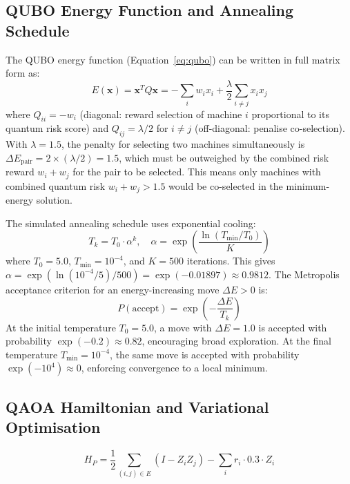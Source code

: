 \subsection{QUBO Energy Function and Annealing Schedule}

The QUBO energy function (Equation~\ref{eq:qubo}) can be written in full matrix form as:
\begin{equation}
    E(\mathbf{x}) = \mathbf{x}^T Q \mathbf{x} = -\sum_{i} w_i x_i + \frac{\lambda}{2}\sum_{i \neq j} x_i x_j
    \label{eq:qubo_full}
    \label{eq:qubo}
\end{equation}
where $Q_{ii} = -w_i$ (diagonal: reward selection of machine $i$ proportional to its quantum risk score) and $Q_{ij} = \lambda/2$ for $i \neq j$ (off-diagonal: penalise co-selection). With $\lambda = 1.5$, the penalty for selecting two machines simultaneously is $\Delta E_{\text{pair}} = 2 \times (\lambda/2) = 1.5$, which must be outweighed by the combined risk reward $w_i + w_j$ for the pair to be selected. This means only machines with combined quantum risk $w_i + w_j > 1.5$ would be co-selected in the minimum-energy solution.

The simulated annealing schedule uses exponential cooling:
\begin{equation}
    T_k = T_0 \cdot \alpha^k, \quad \alpha = \exp\!\left(\frac{\ln(T_{\min}/T_0)}{K}\right)
    \label{eq:sa_schedule}
\end{equation}
where $T_0 = 5.0$, $T_{\min} = 10^{-4}$, and $K = 500$ iterations. This gives $\alpha = \exp(\ln(10^{-4}/5)/500) = \exp(-0.01897) \approx 0.9812$. The Metropolis acceptance criterion for an energy-increasing move $\Delta E > 0$ is:
\begin{equation}
    P(\text{accept}) = \exp\!\left(-\frac{\Delta E}{T_k}\right)
    \label{eq:metropolis}
\end{equation}
At the initial temperature $T_0 = 5.0$, a move with $\Delta E = 1.0$ is accepted with probability $\exp(-0.2) \approx 0.82$, encouraging broad exploration. At the final temperature $T_{\min} = 10^{-4}$, the same move is accepted with probability $\exp(-10^4) \approx 0$, enforcing convergence to a local minimum.

\subsection{QAOA Hamiltonian and Variational Optimisation}

\begin{equation}
    H_P = \frac{1}{2} \sum_{(i,j) \in E} (I - Z_i Z_j) - \sum_i r_i \cdot 0.3 \cdot Z_i
    \label{eq:qaoa_hamiltonian}
\end{equation}

